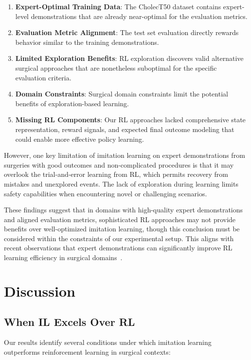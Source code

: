 \documentclass[runningheads]{llncs}
\begin{document}
\begin{enumerate}
\item \textbf{Expert-Optimal Training Data}: The CholecT50 dataset contains expert-level demonstrations that are already near-optimal for the evaluation metrics.
\item \textbf{Evaluation Metric Alignment}: The test set evaluation directly rewards behavior similar to the training demonstrations.
\item \textbf{Limited Exploration Benefits}: RL exploration discovers valid alternative surgical approaches that are nonetheless suboptimal for the specific evaluation criteria.
\item \textbf{Domain Constraints}: Surgical domain constraints limit the potential benefits of exploration-based learning.
\item \textbf{Missing RL Components}: Our RL approaches lacked comprehensive state representation, reward signals, and expected final outcome modeling that could enable more effective policy learning.
\end{enumerate}

However, one key limitation of imitation learning on expert demonstrations from surgeries with good outcomes and non-complicated procedures is that it may overlook the trial-and-error learning from RL, which permits recovery from mistakes and unexplored events. The lack of exploration during learning limits safety capabilities when encountering novel or challenging scenarios.

These findings suggest that in domains with high-quality expert demonstrations and aligned evaluation metrics, sophisticated RL approaches may not provide benefits over well-optimized imitation learning, though this conclusion must be considered within the constraints of our experimental setup. This aligns with recent observations that expert demonstrations can significantly improve RL learning efficiency in surgical domains~\cite{liu2024surgical}.


\section{Discussion}

\subsection{When IL Excels Over RL}

Our results identify several conditions under which imitation learning outperforms reinforcement learning in surgical contexts:
\end{document}

